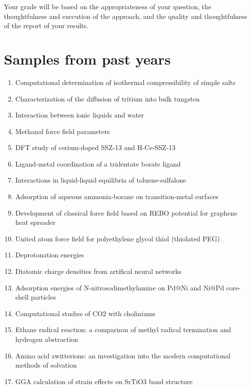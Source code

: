 \documentclass[11pt]{article}
\begin{document}
Your grade will be based on the appropriateness of your question, the thoughtfulness and execution of the approach, and the quality and thoughtfulness of the report of your results.

\section{Samples from past years}
\label{sec:org6552ffc}
\begin{enumerate}
\item Computational determination of isothermal compressibility of simple salts
\item Characterization of the diffusion of tritium into bulk tungsten
\item Interaction between ionic liquids and water
\item Methanol force field parameters
\item DFT study of cerium-doped SSZ-13 and H-Ce-SSZ-13
\item Ligand-metal coordination of a tridentate borate ligand
\item Interactions in liquid-liquid equilibria of toluene-sulfalone
\item Adsorption of aqueous ammonia-borane on transition-metal surfaces
\item Development of classical force field based on REBO potential for graphene heat spreader
\item United atom force field for polyethylene glycol thiol (thiolated PEG)
\item Deprotonation energies
\item Diatomic charge densities from artifical neural networks
\item Adsorption energies of N-nitrosodimethylamine on Pd@Ni and Ni@Pd core-shell particles
\item Computational studies of CO2 with choliniums
\item Ethane radical reaction: a comparison of methyl radical termination and hydrogen abstraction
\item Amino acid zwitterions: an investigation into the modern computational methods of solvation
\item GGA calculation of strain effects on SrTiO3 band structure
\end{enumerate}
\end{document}
